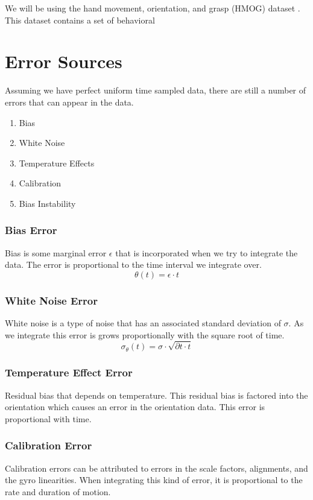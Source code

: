 \documentclass[10pt]{beamer}
\begin{document}
\begin{frame}
We will be using the hand movement, orientation, and
grasp (HMOG) dataset \cite{phone}. This dataset contains a set of behavioral  
\end{frame}

\section{Error Sources}

\begin{frame}
Assuming we have perfect uniform time sampled data, there are still a number of errors that can appear in the data.
\begin{enumerate}
\item Bias
\item White Noise
\item Temperature Effects
\item Calibration
\item Bias Instability
\end{enumerate}
\end{frame}

\begin{frame}
\frametitle{Bias Error}
Bias is some marginal error $\epsilon$ that is incorporated when we try to integrate the data. The error is proportional to the time interval we integrate over.
\begin{equation*}
\theta(t) = \epsilon \cdot t
\end{equation*}
\end{frame}

\begin{frame}
\frametitle{White Noise Error}
White noise is a type of noise that has an associated standard deviation of $\sigma$. As we integrate this error is grows proportionally with the square root of time. 
\begin{equation*}
\sigma_{\theta}(t) = \sigma \cdot \sqrt{\partial t \cdot t}
\end{equation*}
\end{frame}

\begin{frame}
\frametitle{Temperature Effect Error}
Residual bias that depends on temperature. This residual bias is factored into the orientation which causes an error in the orientation data. This error is proportional with time.
\end{frame}

\begin{frame}
\frametitle{Calibration Error}
Calibration errors can be attributed to errors in the scale factors, alignments, and the gyro linearities. When integrating this kind of error, it is proportional to the rate and duration of motion.
\end{frame}
\end{document}
